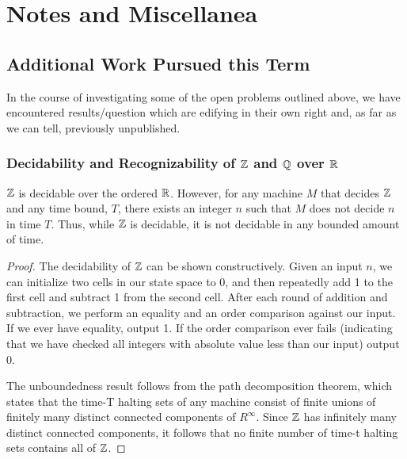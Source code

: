 \chapter{Notes and Miscellanea}

\section{Additional Work Pursued this Term}

In the course of investigating some of the open problems outlined
above, we have encountered results/question which are edifying in
their own right and, as far as we can tell, previously unpublished.

\subsection*{Decidability and Recognizability of $\mathbb{Z}$ and $\mathbb{Q}$ over $\mathbb{R}$}

\begin{theorem}{$\mathbb{Z}$ is decidable over the ordered $\mathbb{R}$.
    However, for any machine $M$ that decides $\mathbb{Z}$ and any time
    bound, $T$, there exists an integer $n$ such that $M$ does not
    decide $n$ in time $T$.  Thus, while $\mathbb{Z}$ is decidable, it
    is not decidable in any bounded amount of time.}
\end{theorem}

\begin{proof}
  The decidability of $\mathbb{Z}$ can be shown constructively.  Given
  an input $n$, we can initialize two cells in our state space to 0,
  and then repeatedly add 1 to the first cell and subtract 1 from the
  second cell.  After each round of addition and subtraction, we
  perform an equality and an order comparison against our input.  If
  we ever have equality, output 1.  If the order comparison ever fails
  (indicating that we have checked all integers with absolute value
  less than our input) output 0.

  The unboundedness result follows from the path decomposition
  theorem, which states that the time-T halting sets of any machine
  consist of finite unions of finitely many distinct connected
  components of $R^\infty$.  Since $\mathbb{Z}$ has infinitely many
  distinct connected components, it follows that no finite number of
  time-t halting sets contains all of $\mathbb{Z}$.
\end{proof}


